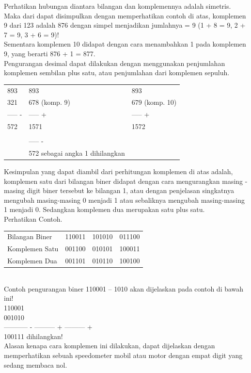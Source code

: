 \begin{enumerate}[label=(\alph*)]
\begin{enumerate}
\qquad Perhatikan hubungan diantara bilangan dan komplemennya adalah simetris. Maka dari dapat disimpulkan dengan memperhatikan contoh di atas, komplemen 9 dari 123 adalah 876 dengan simpel menjadikan jumlahnya = 9 (1 + 8 = 9, 2 + 7 = 9, 3 + 6 = 9)! \\


\qquad Sementara komplemen 10 didapat dengan cara menambahkan 1 pada komplemen 9, yang berarti 876 + 1 = 877. \\

\qquad Pengurangan desimal dapat dilakukan dengan menggunakan penjumlahan komplemen sembilan plus satu, atau penjumlahan dari komplemen sepuluh. \\


\begin{tabular}{ l l l }
893 &    893 &   893 \\
321 &    678 (komp. 9) &   679 (komp. 10) \\
----- - & ----- + & ----- + \\
572 & 1571 & 1572 \\
&   \quad1 & \\
& ----- - & \\
&  572 sebagai angka 1 dihilangkan& \\
\end{tabular}

\end{enumerate}
\qquad Kesimpulan yang dapat diambil dari perhitungan komplemen di atas adalah, komplemen satu dari bilangan biner didapat dengan cara mengurangkan masing - masing digit biner tersebut ke bilangan 1, atau dengan penjelasan singkatnya mengubah masing-masing 0 menjadi 1 atau sebaliknya mengubah masing-masing 1 menjadi 0. Sedangkan komplemen dua merupakan satu plus satu. \\
Perhatikan Contoh. \\

\begin{tabular}{ l l l l }
Bilangan Biner &110011& 101010& 011100 \\
Komplemen Satu& 001100 &010101 &100011 \\
Komplemen Dua& 001101& 010110& 100100 \\
\end{tabular}\\

\quad Contoh pengurangan biner 110001 – 1010 akan dijelaskan pada contoh di bawah ini! \\
110001   \\
001010   \\
----------- - --------- + --------- + \\
100111   dihilangkan! \\

\qquad Alasan kenapa cara komplemen ini dilakukan, dapat dijelaskan dengan memperhatikan sebuah speedometer mobil atau motor dengan empat digit yang sedang membaca nol. \\

\end{enumerate}

%
